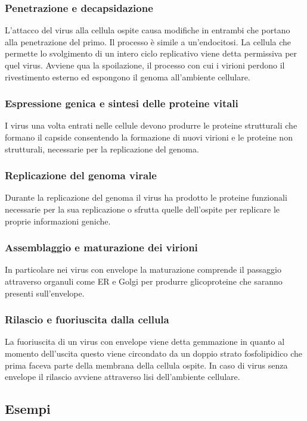 		\subsubsection{Penetrazione e decapsidazione}
		L'attacco del virus alla cellula ospite causa modifiche in entrambi che portano alla penetrazione del primo.
		Il processo \`e simile a un'endocitosi.
		La cellula che permette lo svolgimento di un intero ciclo replicativo viene detta permissiva per quel virus.
		Avviene qua la spoilazione, il processo con cui i virioni perdono il rivestimento esterno ed espongono il genoma all'ambiente cellulare.

		\subsubsection{Espressione genica e sintesi delle proteine vitali}
		I virus una volta entrati nelle cellule devono produrre le proteine strutturali che formano il capside consentendo la formazione di nuovi virioni e le proteine non strutturali, necessarie per la replicazione del genoma.

		\subsubsection{Replicazione del genoma virale}
		Durante la replicazione del genoma il virus ha prodotto le proteine funzionali necessarie per la sua replicazione o sfrutta quelle dell'ospite per replicare le proprie informazioni geniche.

		\subsubsection{Assemblaggio e maturazione dei virioni}
		In particolare nei virus con envelope la maturazione comprende il passaggio attraverso organuli come ER e Golgi per produrre glicoproteine che saranno presenti sull'envelope.

		\subsubsection{Rilascio e fuoriuscita dalla cellula}
		La fuoriuscita di un virus con envelope viene detta gemmazione in quanto al momento dell'uscita questo viene circondato da un doppio strato fosfolipidico che prima faceva parte della membrana della cellula ospite.
		In caso di virus senza envelope il rilascio avviene attraverso lisi dell'ambiente cellulare.


	\subsection{Esempi}

